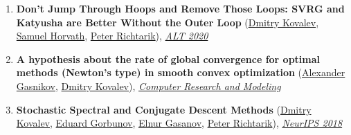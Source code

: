 \begin{enumerate}
\item \textbf{Don't Jump Through Hoops and Remove Those Loops: SVRG and Katyusha are Better Without the Outer Loop} (\href{https://www.dmitry-kovalev.com}{\color{linkcolour}Dmitry Kovalev}, \href{https://samuelhorvath.github.io}{\color{linkcolour}Samuel Horvath}, \href{https://richtarik.org}{\color{linkcolour}Peter Richtarik}), \href{http://proceedings.mlr.press/v117/kovalev20a}{\em \color{black}ALT 2020}
\item \textbf{A hypothesis about the rate of global convergence for optimal methods (Newton's type) in smooth convex optimization} (\href{https://scholar.google.ru/citations?user=AmeE8qkAAAAJ}{\color{linkcolour}Alexander Gasnikov}, \href{https://www.dmitry-kovalev.com}{\color{linkcolour}Dmitry Kovalev}), \href{http://crm-en.ics.org.ru/journal/article/2685/}{\em \color{black}Computer Research and Modeling}
\item \textbf{Stochastic Spectral and Conjugate Descent Methods} (\href{https://www.dmitry-kovalev.com}{\color{linkcolour}Dmitry Kovalev}, \href{https://eduardgorbunov.github.io}{\color{linkcolour}Eduard Gorbunov}, \href{https://elnurgasanov.com}{\color{linkcolour}Elnur Gasanov}, \href{https://richtarik.org}{\color{linkcolour}Peter Richtarik}), \href{https://papers.nips.cc/paper/7596-stochastic-spectral-and-conjugate-descent-methods}{\em \color{black}NeurIPS 2018}
\end{enumerate}
